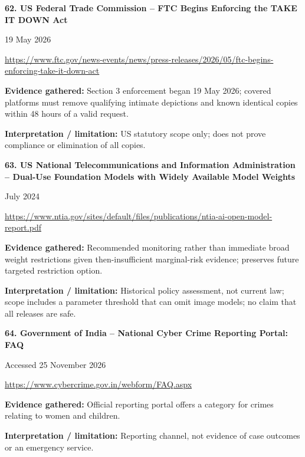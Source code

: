 \documentclass[11pt,a4paper]{article}
\begin{document}
\noindent\begin{minipage}{\linewidth}\textbf{62. US Federal Trade Commission -- FTC Begins Enforcing the TAKE IT DOWN Act}\par{\small 19 May 2026\par\url{https://www.ftc.gov/news-events/news/press-releases/2026/05/ftc-begins-enforcing-take-it-down-act}}\par
\textbf{Evidence gathered:} Section 3 enforcement began 19 May 2026; covered platforms must remove qualifying intimate depictions and known identical copies within 48 hours of a valid request.\par\textbf{Interpretation / limitation:} US statutory scope only; does not prove compliance or elimination of all copies.\par
\end{minipage}\par\vspace{2mm}
\noindent\begin{minipage}{\linewidth}\textbf{63. US National Telecommunications and Information Administration -- Dual-Use Foundation Models with Widely Available Model Weights}\par{\small July 2024\par\url{https://www.ntia.gov/sites/default/files/publications/ntia-ai-open-model-report.pdf}}\par
\textbf{Evidence gathered:} Recommended monitoring rather than immediate broad weight restrictions given then-insufficient marginal-risk evidence; preserves future targeted restriction option.\par\textbf{Interpretation / limitation:} Historical policy assessment, not current law; scope includes a parameter threshold that can omit image models; no claim that all releases are safe.\par
\end{minipage}\par\vspace{2mm}
\noindent\begin{minipage}{\linewidth}\textbf{64. Government of India -- National Cyber Crime Reporting Portal: FAQ}\par{\small Accessed 25 November 2026\par\url{https://www.cybercrime.gov.in/webform/FAQ.aspx}}\par
\textbf{Evidence gathered:} Official reporting portal offers a category for crimes relating to women and children.\par\textbf{Interpretation / limitation:} Reporting channel, not evidence of case outcomes or an emergency service.\par
\end{minipage}\par\vspace{2mm}
\end{document}
